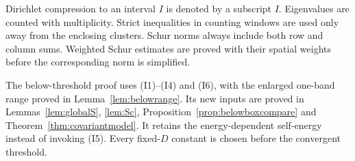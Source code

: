 Dirichlet compression to an interval $I$ is denoted by a subscript $I$. Eigenvalues are counted with multiplicity. Strict inequalities in counting windows are used only away from the enclosing clusters. Schur norms always include both row and column sums. Weighted Schur estimates are proved with their spatial weights before the corresponding norm is simplified.

The below-threshold proof uses (I1)--(I4) and (I6), with the enlarged one-band range proved in Lemma~\ref{lem:belowrange}. Its new inputs are proved in Lemmas~\ref{lem:globalS}, \ref{lem:Sc}, Proposition~\ref{prop:belowboxcompare} and Theorem~\ref{thm:covariantmodel}. It retains the energy-dependent self-energy instead of invoking (I5). Every fixed-$D$ constant is chosen before the convergent threshold.
\label{end:methods}
